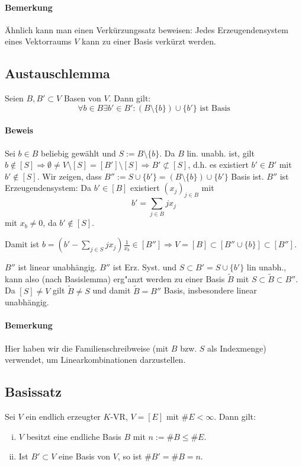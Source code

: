 \paragraph{Bemerkung}
    Ähnlich kann man einen Verkürzungssatz beweisen: Jedes Erzeugendensystem eines Vektorraums $V$ kann zu einer Basis verkürzt werden.

\subsection{Austauschlemma}
    \begin{Lemma}[Austauschlemma]
    	Seien $B,B' \subset V$ Basen von $V$. Dann gilt:
    \begin{equation*}
        \forall b\in B \exists b' \in B': (B\setminus\{b\})\cup\{b'\} \text{ ist Basis}
    \end{equation*}
    \end{Lemma}
    
\paragraph{Beweis}
    Sei $b\in B$ beliebig gewählt und $S:= B\setminus \{b\}$. Da $B$ lin. unabh. ist, gilt $b\notin [S] \Rightarrow \emptyset \neq V\setminus [S] = [B']\setminus [S] \Rightarrow B' \not\subset [S]$, d.h. es existiert $b' \in B'$ mit $b' \notin [S]$. Wir zeigen, dass $B'' := S\cup \{b'\} = (B\setminus\{b\})\cup \{b'\}$ Basis ist. $B''$ ist Erzeugendensystem: Da $b'\in [B]$ existiert $(x_j)_{j\in B}$ mit $$b' = \sum_{j\in B} jx_j $$ mit $x_b \neq 0$, da $b' \notin [S]$.

    Damit ist $b=(b'-\sum_{j\in S} jx_j)\frac{1}{x_b} \in [B''] \Rightarrow V = [B] \subset [B'' \cup \{b\}] \subset [B'']$.
    
    $B''$ ist linear unabhängig. $B''$ ist Erz. Syst. und $S\subset B' = S \cup \{b'\}$ lin unabh., kann also (nach Basislemma) erg"anzt werden zu einer Basis $\tilde{B}$ mit $S\subset \tilde{B}\subset B''$.
    Da $[S] \neq V$ gilt $\tilde{B} \neq S$ und damit $\tilde{B} = B''$ Basis, insbesondere linear unabhängig.
    
\paragraph{Bemerkung}
    Hier haben wir die Familienschreibweise (mit $B$ bzw. $S$ als Indexmenge) verwendet, um Linearkombinationen darzustellen.
    
\subsection{Basissatz}
	\begin{Satz}[Basissatz]
	Sei $V$ ein endlich erzeugter $K$-VR, $V=[E]$ mit $\#E < \infty$. Dann gilt:
	\begin{enumerate}[(i)]
		\item $V$ besitzt eine endliche Basis $B$ mit $n:= \#B \leq \#E$.
		\item Ist $B'\subset V$ eine Basis von $V$, so ist $\#B' = \#B = n$.
	\end{enumerate}
	\end{Satz}
    
